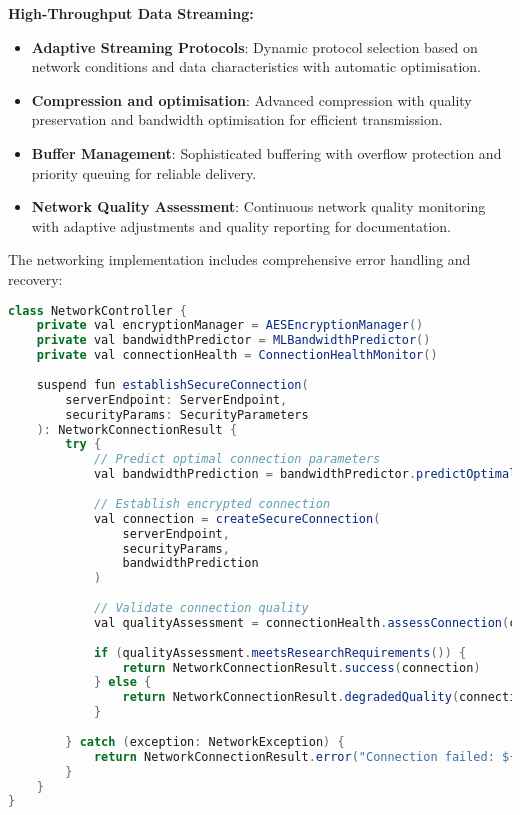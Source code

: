 \documentclass[11pt,a4paper]{report}
\begin{document}
\textbf{High-Throughput Data Streaming:}
\begin{itemize}
  \item \textbf{Adaptive Streaming Protocols}: Dynamic protocol selection based on network conditions and data characteristics with automatic optimisation.
  \item \textbf{Compression and optimisation}: Advanced compression with quality preservation and bandwidth optimisation for efficient transmission.
  \item \textbf{Buffer Management}: Sophisticated buffering with overflow protection and priority queuing for reliable delivery.
  \item \textbf{Network Quality Assessment}: Continuous network quality monitoring with adaptive adjustments and quality reporting for documentation.
\end{itemize}

The networking implementation includes comprehensive error handling and recovery:

\begin{lstlisting}[language=Java]
class NetworkController {
    private val encryptionManager = AESEncryptionManager()
    private val bandwidthPredictor = MLBandwidthPredictor()
    private val connectionHealth = ConnectionHealthMonitor()
    
    suspend fun establishSecureConnection(
        serverEndpoint: ServerEndpoint,
        securityParams: SecurityParameters
    ): NetworkConnectionResult {
        try {
            // Predict optimal connection parameters
            val bandwidthPrediction = bandwidthPredictor.predictOptimalSettings()
            
            // Establish encrypted connection
            val connection = createSecureConnection(
                serverEndpoint,
                securityParams,
                bandwidthPrediction
            )
            
            // Validate connection quality
            val qualityAssessment = connectionHealth.assessConnection(connection)
            
            if (qualityAssessment.meetsResearchRequirements()) {
                return NetworkConnectionResult.success(connection)
            } else {
                return NetworkConnectionResult.degradedQuality(connection, qualityAssessment)
            }
            
        } catch (exception: NetworkException) {
            return NetworkConnectionResult.error("Connection failed: ${exception.message}")
        }
    }
}
\end{lstlisting}
\end{document}
